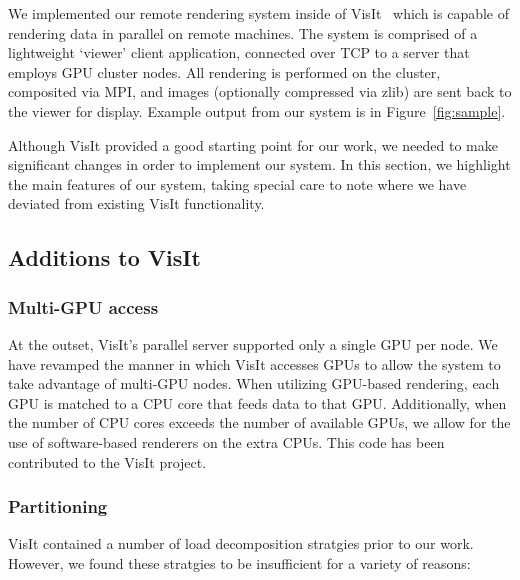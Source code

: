 We implemented our remote rendering system inside of
VisIt~\cite{Childs:2005:Contracts, Childs:2012:VisIt} which is capable
of rendering data in parallel on remote machines.  The system is
comprised of a lightweight `viewer' client application, connected over
TCP to a server that employs GPU cluster nodes.  All rendering is
performed on the cluster, composited via MPI, and images (optionally
compressed via zlib) are sent back to the viewer for display.  Example
output from our system is
in Figure~\ref{fig:sample}.

Although VisIt provided a good starting point for our work, we needed
to make significant changes in order to implement our system.  In this
section, we highlight the main features of our system, taking special
care to note where we have deviated from existing VisIt functionality.

\subsection{Additions to VisIt}

\subsubsection{Multi-GPU access}

At the outset, VisIt's parallel server supported only a single GPU per
node.  We have revamped the manner in which VisIt accesses GPUs to
allow the system to take advantage of multi-GPU nodes.  When utilizing
GPU-based rendering, each GPU is matched to a CPU core that feeds
data to that GPU.  Additionally, when the number of CPU cores exceeds
the number of available GPUs, we allow for the use of software-based
renderers on the extra CPUs.  This code has been contributed to the
VisIt project.

\subsubsection{Partitioning}

VisIt contained a number of load decomposition stratgies prior to our
work.  However, we found these stratgies to be insufficient for a
variety of reasons:

